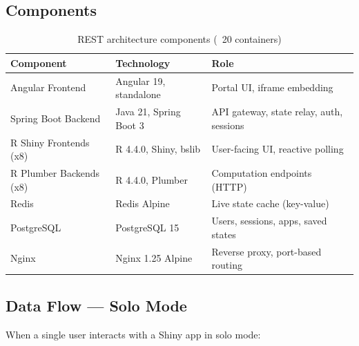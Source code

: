 \documentclass[12pt,a4paper]{article}
\begin{document}
\subsection{Components}

\begin{table}[h]
\centering
\small
\begin{tabular}{@{}lll@{}}
\toprule
\textbf{Component} & \textbf{Technology} & \textbf{Role} \\
\midrule
Angular Frontend & Angular 19, standalone & Portal UI, iframe embedding \\
Spring Boot Backend & Java 21, Spring Boot 3 & API gateway, state relay, auth, sessions \\
R Shiny Frontends (x8) & R 4.4.0, Shiny, bslib & User-facing UI, reactive polling \\
R Plumber Backends (x8) & R 4.4.0, Plumber & Computation endpoints (HTTP) \\
Redis & Redis Alpine & Live state cache (key-value) \\
PostgreSQL & PostgreSQL 15 & Users, sessions, apps, saved states \\
Nginx & Nginx 1.25 Alpine & Reverse proxy, port-based routing \\
\bottomrule
\end{tabular}
\caption{REST architecture components (~20 containers)}
\end{table}

\subsection{Data Flow --- Solo Mode}

When a single user interacts with a Shiny app in solo mode:
\end{document}
